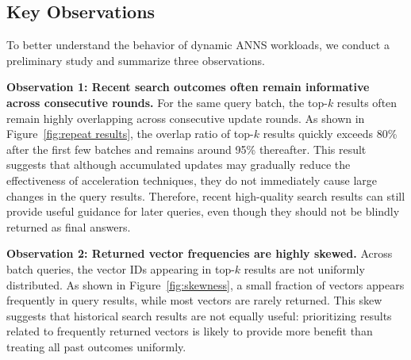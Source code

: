 



\subsection{Key Observations}

To better understand the behavior of dynamic ANNS workloads, we conduct a preliminary study and summarize three observations.

\noindent\textbf{Observation 1: Recent search outcomes often remain informative across consecutive rounds.} For the same query batch, the top-$k$ results often remain highly overlapping across consecutive update rounds. 
As shown in Figure~\ref{fig:repeat results}, the 
overlap ratio of top-$k$ results quickly exceeds 80\% after the first few batches and remains around 95\% thereafter. This result suggests that although accumulated updates may gradually reduce the effectiveness of acceleration techniques, they do not immediately cause large 
changes in the query results. Therefore, recent high-quality search results can still provide useful guidance for later queries, even though they should not be blindly returned as final answers.



\noindent\textbf{Observation 2: Returned vector frequencies are highly skewed.}
Across batch queries, the vector IDs appearing in top-$k$ results are not uniformly distributed. As shown in Figure~\ref{fig:skewness}, a small fraction of vectors appears frequently in query results, while most vectors are rarely returned.
This skew suggests that historical search results are not equally useful: prioritizing results related to frequently returned vectors is likely to provide more benefit than treating all past outcomes uniformly.

